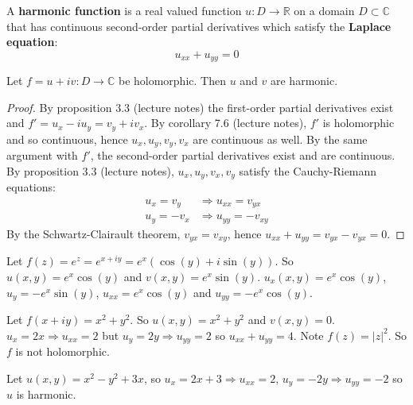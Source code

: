 \begin{definition}
	A \textbf{harmonic function} is a real valued function $u: D \rightarrow \mathbb{R}$ on a domain $D \subset \mathbb{C}$ that has continuous second-order partial derivatives which satisfy the \textbf{Laplace equation}:
	\[
		u_{xx} + u_{yy} = 0
	\]
\end{definition}

\begin{proposition}
	Let $f = u + iv: D \rightarrow \mathbb{C}$ be holomorphic. Then $u$ and $v$ are harmonic.
\end{proposition}

\begin{proof}
	By proposition 3.3 (lecture notes) the first-order partial derivatives exist and $f' = u_x - i u_y = v_y + i v_x$. By corollary 7.6 (lecture notes), $f'$ is holomorphic and so continuous, hence $u_x, u_y, v_y, v_x$ are continuous as well. By the same argument with $f'$, the second-order partial derivatives exist and are continuous. By proposition 3.3 (lecture notes), $u_x, u_y, v_x, v_y$ satisfy the Cauchy-Riemann equations:
	\[
		\begin{aligned}
			u_x = v_y & \Longrightarrow u_{xx} = v_{yx} \\
			u_y = -v_x & \Longrightarrow u_{yy} = -v_{xy}
		\end{aligned}
	\]
	By the Schwartz-Clairault theorem, $v_{yx} = v_{xy}$, hence $u_{xx} + u_{yy} = v_{yx} - v_{yx} = 0$.
\end{proof}

\begin{example}
	Let $f(z) = e^z = e^{x + iy} = e^x (\cos(y) + i \sin(y))$. So $u(x, y) = e^x \cos(y)$ and $v(x, y) = e^x \sin(y)$. $u_x (x, y) = e^x \cos(y)$, $u_y = -e^x \sin(y)$, $u_{xx} = e^x \cos(y)$ and $u_{yy} = -e^x \cos(y)$.
\end{example}

\begin{example}
	Let $f(x + iy) = x^2 + y^2$. So $u(x, y) = x^2 + y^2$ and $v(x, y) = 0$. $u_x = 2x \Longrightarrow u_{xx} = 2$ but $u_y = 2y \Longrightarrow u_{yy} = 2$ so $u_{xx} + u_{yy} = 4$. Note $f(z) = |z|^2$. So $f$ is not holomorphic.
\end{example}

\begin{example}
	Let $u(x, y) = x^2 - y^2 + 3x$, so $u_x = 2x + 3 \Longrightarrow u_{xx} = 2$, $u_y = -2y \Longrightarrow u_{yy} = -2$ so $u$ is harmonic.
\end{example}


